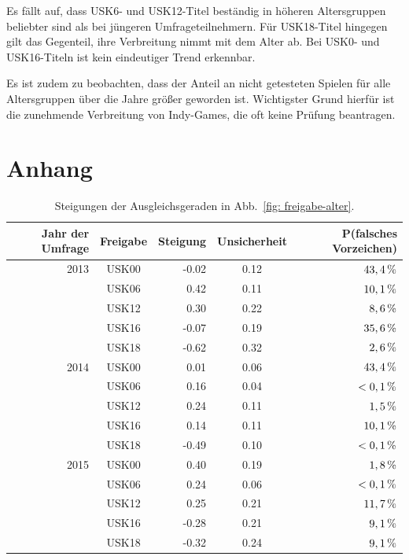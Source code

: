 \documentclass[11pt]{scrartcl}
\begin{document}
Es fällt auf,
dass USK6- und USK12-Titel beständig in höheren Altersgruppen beliebter
sind als bei jüngeren Umfrageteilnehmern.
Für USK18-Titel hingegen gilt das Gegenteil,
ihre Verbreitung nimmt mit dem Alter ab.
Bei USK0- und USK16-Titeln ist kein eindeutiger Trend erkennbar.

Es ist zudem zu beobachten,
dass der Anteil an nicht getesteten Spielen für alle Altersgruppen
über die Jahre größer geworden ist.
Wichtigster Grund hierfür ist die zunehmende Verbreitung von Indy-Games,
die oft keine Prüfung beantragen.

\newpage
\section{Anhang}

\begin{table}[ht]
\caption{Steigungen der Ausgleichsgeraden in Abb.~\ref{fig: freigabe-alter}.}
\label{tab: freigabe-alter}
\vspace{1em}
\centering
\begin{tabular}{r|c|r|c|r}
Jahr der Umfrage & Freigabe	&	Steigung	& Unsicherheit & P(falsches Vorzeichen)\\
\hline
2013 & USK00 & -0.02 & 0.12 & \(\unit[ 43,4]{\%}\)\\
	 & USK06 &  0.42 & 0.11 & \(\unit[ 10,1]{\%}\)\\
	 & USK12 &  0.30 & 0.22 & \(\unit[  8,6]{\%}\)\\
	 & USK16 & -0.07 & 0.19 & \(\unit[ 35,6]{\%}\)\\
	 & USK18 & -0.62 & 0.32 & \(\unit[  2,6]{\%}\)\\
\hline
2014 & USK00 &  0.01 & 0.06 & \(\unit[43,4]{\%}\)\\
	 & USK06 &  0.16 & 0.04 & \(\unit[<0,1]{\%}\)\\
	 & USK12 &  0.24 & 0.11 & \(\unit[ 1,5]{\%}\)\\
	 & USK16 &  0.14 & 0.11 & \(\unit[10,1]{\%}\)\\
	 & USK18 & -0.49 & 0.10 & \(\unit[<0,1]{\%}\)\\
\hline
2015 & USK00 &  0.40 & 0.19 & \(\unit[ 1,8]{\%}\)\\
	 & USK06 &  0.24 & 0.06 & \(\unit[<0,1]{\%}\)\\
	 & USK12 &  0.25 & 0.21 & \(\unit[11,7]{\%}\)\\
	 & USK16 & -0.28 & 0.21 & \(\unit[ 9,1]{\%}\)\\
	 & USK18 & -0.32 & 0.24 & \(\unit[ 9,1]{\%}\)\\
\end{tabular}
\end{table}


\clearpage
{}

\end{document}
